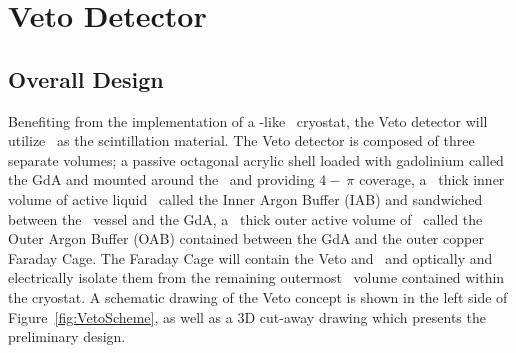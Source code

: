 \section{Veto Detector}
\label{sec:Veto}

\subsection{Overall Design}

Benefiting from the implementation of a \pDUNE-like \AAr\ cryostat, the Veto detector will utilize \AAr\ as the scintillation material. The Veto detector is composed of three separate volumes; a passive octagonal acrylic shell loaded with gadolinium called the GdA and mounted around the \TPC\ and providing $4-~\pi$ coverage, a  \DSkVetoIABThickness\ thick inner volume of active liquid \AAr\ called the Inner Argon Buffer (IAB) and sandwiched between the \TPC\ vessel and the GdA, a  \DSkVetoOABThickness\ thick outer active volume of \AAr\ called the Outer Argon Buffer (OAB) contained between the GdA and the outer copper Faraday Cage.  The Faraday Cage will contain the Veto and \TPC\ and optically and electrically isolate them from the remaining outermost \AAr\ volume contained within the cryostat.  A schematic drawing of the Veto concept is shown in the left side of Figure~\ref{fig:VetoScheme}, as well as a 3D cut-away drawing which presents the preliminary design.

